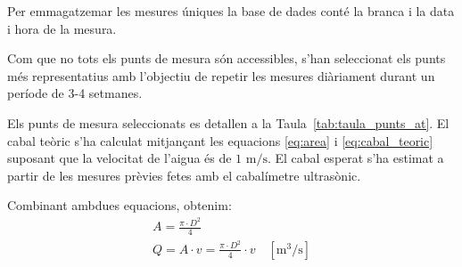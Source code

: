 \documentclass[11pt]{article}
\begin{document}
Per emmagatzemar les mesures úniques la base de dades conté la branca i la data i hora de la mesura.

Com que no tots els punts de mesura són accessibles, s'han seleccionat els punts més representatius amb l'objectiu de repetir les mesures diàriament durant un període de 3-4 setmanes.

Els punts de mesura seleccionats es detallen a la Taula~\ref{tab:taula_punts_at}. El cabal teòric s'ha calculat mitjançant les equacions \eqref{eq:area} i \eqref{eq:cabal_teoric} suposant que la velocitat de l'aigua és de $1 \text{ m/s}$. El cabal esperat s'ha estimat a partir de les mesures prèvies fetes amb el cabalímetre ultrasònic.


Combinant ambdues equacions, obtenim:
\begin{gather}
    A = \frac{\pi \cdot D^2}{4} \label{eq:area} \\
    Q = A \cdot v = \frac{\pi \cdot D^2}{4} \cdot v \quad [\mathrm{m^3/s}]
    \label{eq:cabal_teoric}
\end{gather}
\end{document}
